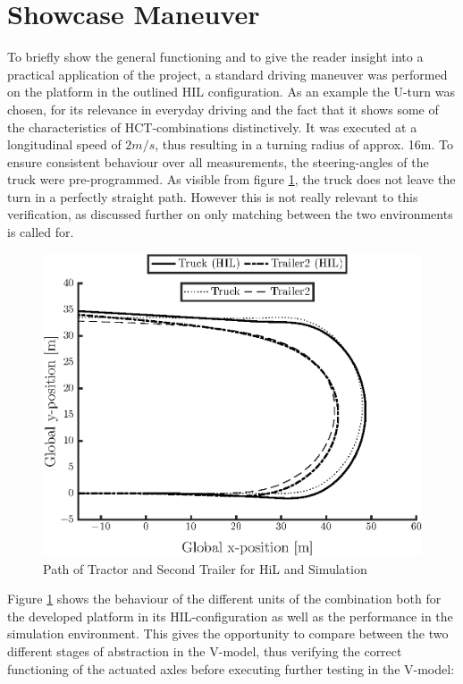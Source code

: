 \documentclass[root.tex]{subfiles}
\begin{document}
	
	{\pagestyle{empty}}
	\section{Showcase Maneuver}
	\label{chap:Showcase_Maneuver}
	To briefly show the general functioning and to give the reader insight into a practical application of the project, a standard driving maneuver was performed on the platform in the outlined \gls{HIL} configuration. As an example the U-turn was chosen, for its relevance in everyday driving and the fact that it shows some of the characteristics of \gls{HCT}-combinations distinctively. It was executed at a longitudinal speed of $2m/s$, thus resulting in a turning radius of approx. 16m. To ensure consistent behaviour over all measurements, the steering-angles of the truck were pre-programmed. As visible from figure \ref{fig:Path}, the truck does not leave the turn in a perfectly straight path. However this is not really relevant to this verification, as discussed further on only matching between the two environments is called for.
	
	\begin{figure}[!h]
		
		\includegraphics[width=1\linewidth]{xy_HIL_and_VTM}
		\caption[Path of Tractor and Second Trailer for HiL and Simulation]{Path of Tractor and Second Trailer for HiL and Simulation}
		
		\label{fig:Path}
	\end{figure}
	
	
	Figure \ref{fig:Path} shows the behaviour of the different units of the combination both for the developed platform in its \gls{HIL}-configuration as well as the performance in the simulation environment. This gives the opportunity to compare between the two different stages of abstraction in the V-model, thus verifying the correct functioning of the actuated axles before executing further testing in the V-model:
	
\end{document}
